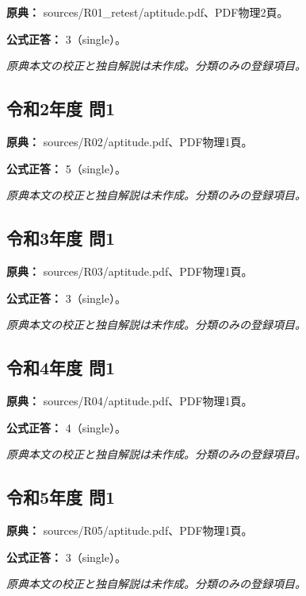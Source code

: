 \noindent\textbf{原典：} sources/R01\_retest/aptitude.pdf、PDF物理2頁。

\textbf{公式正答：} 3（single）。

\par\textit{原典本文の校正と独自解説は未作成。分類のみの登録項目。}

\subsection{令和2年度 問1}
\label{q:r02-reg-apt-01}

\noindent\textbf{原典：} sources/R02/aptitude.pdf、PDF物理1頁。

\textbf{公式正答：} 5（single）。

\par\textit{原典本文の校正と独自解説は未作成。分類のみの登録項目。}

\subsection{令和3年度 問1}
\label{q:r03-reg-apt-01}

\noindent\textbf{原典：} sources/R03/aptitude.pdf、PDF物理1頁。

\textbf{公式正答：} 3（single）。

\par\textit{原典本文の校正と独自解説は未作成。分類のみの登録項目。}

\subsection{令和4年度 問1}
\label{q:r04-reg-apt-01}

\noindent\textbf{原典：} sources/R04/aptitude.pdf、PDF物理1頁。

\textbf{公式正答：} 4（single）。

\par\textit{原典本文の校正と独自解説は未作成。分類のみの登録項目。}

\subsection{令和5年度 問1}
\label{q:r05-reg-apt-01}

\noindent\textbf{原典：} sources/R05/aptitude.pdf、PDF物理1頁。

\textbf{公式正答：} 3（single）。

\par\textit{原典本文の校正と独自解説は未作成。分類のみの登録項目。}

